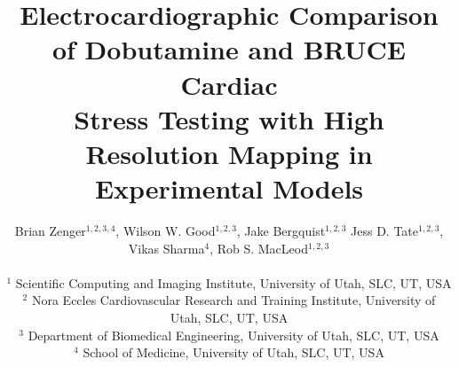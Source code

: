 \documentclass[twocolumn]{cinc}
\begin{document}
\title{Electrocardiographic Comparison of Dobutamine and BRUCE Cardiac \\ Stress Testing with High Resolution Mapping in Experimental Models}


\author { Brian Zenger$^{1,2,3,4}$, Wilson W. Good$^{1,2,3}$, Jake Bergquist$^{1,2,3}$ Jess D. Tate$^{1,2,3}$, Vikas Sharma$^{4}$, Rob S. MacLeod$^{1,2,3}$\\
\ \\ %
$^1$ Scientific Computing and Imaging Institute, University of Utah, SLC, UT, USA \\
$^2$  Nora Eccles Cardiovascular Research and Training Institute, University of Utah, SLC, UT, USA \\
$^3$ Department of Biomedical Engineering, University of Utah, SLC, UT, USA \\
$^4$ School of Medicine, University of Utah, SLC, UT, USA }

\maketitle
\end{document}
